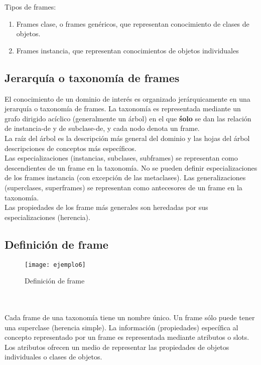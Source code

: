 \documentclass[12pt]{article}
\begin{document}
Tipos de frames:
\begin{enumerate}
\item Frames clase, o frames genéricos, que representan conocimiento de clases de objetos.
\item Frames instancia, que representan conocimientos de objetos individuales
\end{enumerate}

\subsection{Jerarquía o taxonomía de frames}
El conocimiento de un dominio de interés es organizado jerárquicamente en una jerarquía o taxonomía de frames. La taxonomía es representada mediante un grafo dirigido acíclico (generalmente un árbol) en el que \textbf{śolo} se dan las relación de instancia-de y de subclase-de, y cada nodo denota un frame.\\
La raíz del árbol es la descripción más general del dominio y las hojas del árbol descripciones de conceptos más específicos.\\
Las especializaciones (instancias, subclases, subframes) se representan como descendientes de un frame en la taxonomía. No se pueden definir especializaciones de los frames instancia (con excepción de las metaclases). Las generalizaciones (superclases, superframes) se representan como antecesores de un frame en la taxonomía.\\

Las propiedades de los frame más generales son heredadas por sus especializaciones (herencia).

\subsection{Definición de frame}

\begin{wrapfigure}{l}{0.25\textwidth}
\texttt{[image: ejemplo6]}
\caption{Definición de frame} \label{fig:ejemplo6}
\end{wrapfigure}

\ \\
\ \\
Cada frame de una taxonomía tiene un nombre único. Un frame sólo puede tener una superclase (herencia simple). La información (propiedades) específica al concepto representado por un frame es representada mediante atributos o slots. Los atributos ofrecen un medio de representar las propiedades de objetos individuales o clases de objetos.
\end{document}
